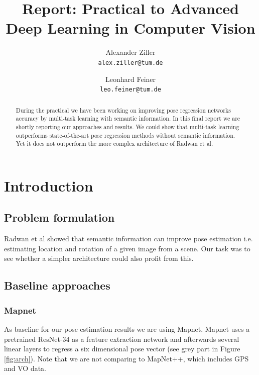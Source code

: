 \documentclass[10pt,twocolumn,letterpaper]{article}
\begin{document}
\title{Report: Practical to Advanced Deep Learning in Computer Vision}

\author{Alexander Ziller\\
{\tt\small alex.ziller@tum.de}
\and
Leonhard Feiner\\
{\tt\small leo.feiner@tum.de}
}

\maketitle

\begin{abstract}
During the practical we have been working on improving pose regression networks accuracy by multi-task learning with semantic information. In this final report we are shortly reporting our approaches and results. We could show that multi-task learning outperforms state-of-the-art pose regression methods without semantic information. Yet it does not outperform the more complex architecture of Radwan et al.
\end{abstract}

\section{Introduction}
\subsection{Problem formulation}
Radwan et al \cite{radwan18ral} showed that semantic information can improve pose estimation i.e. estimating location and rotation of a given image from a scene. Our task was to see whether a simpler architecture could also profit from this. 
\subsection{Baseline approaches}
\subsubsection{Mapnet}\label{sec:mapnet}
As baseline for our pose estimation results we are using Mapnet\cite{mapnet2018}. Mapnet uses a pretrained ResNet-34 as a feature extraction network and afterwards several linear layers to regress a six dimensional pose vector (see grey part in Figure \ref{fig:arch}). Note that we are not comparing to MapNet++, which includes GPS and VO data.
\end{document}
